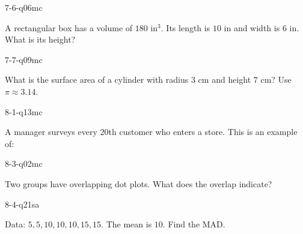 \begin{practiceQuestion}{7-6-q06}{mc}
\begin{questionText}
A rectangular box has a volume of $180$ in$^3$. Its length is $10$ in and width is $6$ in. What is its height?
\end{questionText}
\end{practiceQuestion}

\begin{practiceQuestion}{7-7-q09}{mc}
\begin{questionText}
What is the surface area of a cylinder with radius $3$ cm and height $7$ cm? Use $\pi \approx 3.14$.
\end{questionText}
\end{practiceQuestion}

\begin{practiceQuestion}{8-1-q13}{mc}
\begin{questionText}
A manager surveys every $20$th customer who enters a store. This is an example of:
\end{questionText}
\end{practiceQuestion}

\begin{practiceQuestion}{8-3-q02}{mc}
\begin{questionText}
Two groups have overlapping dot plots. What does the overlap indicate?
\end{questionText}
\end{practiceQuestion}

\begin{practiceQuestion}{8-4-q21}{sa}
\begin{questionText}
Data: $5, 5, 10, 10, 10, 15, 15$. The mean is $10$. Find the MAD.
\end{questionText}
\end{practiceQuestion}

